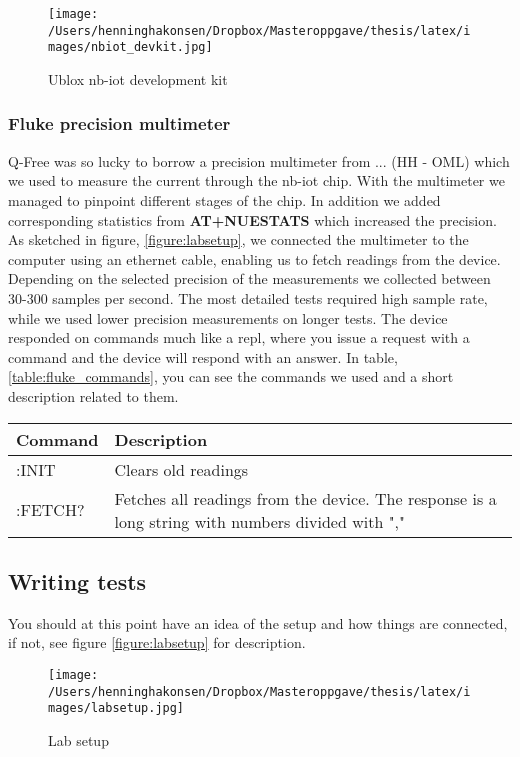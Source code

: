 \documentclass[USenglish]{ifimaster}  %
\begin{document}
\begin{figure}[ht]
  \centering\texttt{[image: /Users/henninghakonsen/Dropbox/Masteroppgave/thesis/latex/images/nbiot\_devkit.jpg]}
  \caption{Ublox \acrshort{nb-iot} development kit}
  \label{pic:nbiotdevkit}
\end{figure}

\subsubsection{Fluke precision multimeter}
Q-Free was so lucky to borrow a precision multimeter from ... (HH - OML) which we used to measure the current through the \acrshort{nb-iot} chip. With the multimeter we managed to pinpoint different stages of the chip. In addition we added corresponding statistics from \textbf{AT+NUESTATS} which increased the precision. As sketched in figure, \vref{figure:labsetup}, we connected the multimeter to the computer using an ethernet cable, enabling us to fetch readings from the device. Depending on the selected precision of the measurements we collected between 30-300 samples per second. The most detailed tests required high sample rate, while we used lower precision measurements on longer tests. The device responded on commands much like a \acrfull{repl}, where you issue a request with a command and the device will respond with an answer. In table, \vref{table:fluke_commands}, you can see the commands we used and a short description related to them.

\begin{center} \label{table:fluke_commands}
  \begin{tabular}{ | l | m{10cm} | }
    \hline
    Command & Description \\
    \hline
    :INIT & Clears old readings \\
    \hline
    :FETCH? & Fetches all readings from the device. The response is a long string with numbers divided with "," \\
    \hline
  \end{tabular}
\end{center}

\subsection{Writing tests}
You should at this point have an idea of the setup and how things are connected, if not, see figure \vref{figure:labsetup} for description.

\begin{figure}[ht]
  \centering\texttt{[image: /Users/henninghakonsen/Dropbox/Masteroppgave/thesis/latex/images/labsetup.jpg]}
  \caption{Lab setup \cite{pcpng35052:online} \cite{fluke88435:online} \cite{ingagrue31:online}}
  \label{figure:labsetup}
\end{figure}
\end{document}
